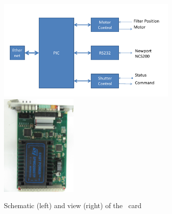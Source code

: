 \begin{itemize}
\begin{figure}[htbp]
\centering
\includegraphics[height=5cm]{figures/licmot_scheme.pdf}
\includegraphics[height=5cm]{figures/licmot.JPG}
\caption{Schematic (left) and view (right) of the \licmot~card}\label{fig:laslicmot}
\end{figure}

\end{itemize}
